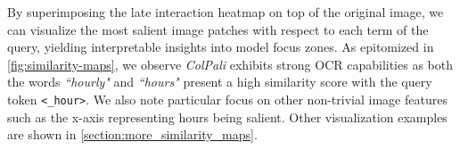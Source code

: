 


By superimposing the late interaction heatmap on top of the original image, we can visualize the most salient image patches with respect to each term of the query, yielding interpretable insights into model focus zones. As epitomized in \autoref{fig:similarity-maps}, we observe \textit{ColPali} exhibits strong OCR capabilities as both the words \textit{``hourly"} and \textit{``hours"} present a high similarity score with the query token \texttt{<\_hour>}. We also note particular focus on other non-trivial image features such as the x-axis representing hours being salient. Other visualization examples are shown in \autoref{section:more_similarity_maps}.





